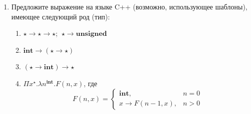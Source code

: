 \documentclass[10pt,a4paper,oneside]{article}
\begin{document}
\begin{enumerate}
\begin{verbatim}
One ("a", Zero (One ((("b","c"),("d","e")), Nil)))
\end{verbatim}

По идее, операция добавления элемента к списку записывается на языке Окамль вот так 
(сравните с прибавлением 1 к числу в двоичной системе счисления):

\begin{verbatim}
let rec add elem lst = match lst with
    Nil -> One (elem,Nil)
  | Zero tl -> One (elem,tl)
  | One (hd,tl) -> Zero (add (elem,hd) tl)
\end{verbatim}

Однако, тип этой функции Окамль вывести автоматически не может, его надо указывать явно,
чтобы код скомпилировался:

\begin{verbatim}
let rec add : 'a . 'a -> 'a bin_list -> 'a bin_list = fun elem lst -> match lst with
\end{verbatim}
\begin{enumerate}
\item Какой тип имеет \verb!add! в (расширенной) системе $F$ (напомним, поскольку функция рекурсивна,
она должна использовать Y-комбинатор в своём определении)?
Считайте, что семейство типов \verb!bin_list 'a! предопределено и обозначается как $\tau_\alpha$.
Также считайте, что определены функции roll и unroll с надлежащими типами.
Какой ранг имеет тип этой функции? Почему этот тип не выразим в типовой системе Хиндли-Милнера?
\item Предложите функции для печати списка и для удаления элемента списка (головы).
\item Предложите функцию для эффективного соединения двух списков (источник для 
вдохновения --- сложение двух чисел в столбик).
\item Предложите функцию для эффективного выделения $n$-го элемента из списка.
\end{enumerate}


\item Предложите выражение на языке C++ (возможно, использующее шаблоны), имеющее следующий род (тип):
\begin{enumerate}
\item $\star\rightarrow\star\rightarrow\star$; $\ \star\rightarrow\textbf{unsigned}$
\item $\textbf{int}\rightarrow(\star\rightarrow\star)$
\item $(\star\rightarrow\textbf{int})\rightarrow\star$
\item $\Pi x^\star.\lambda n^\textbf{int}.F(n,x)$, где $$F(n,x) = \left\{\begin{array}{ll}\textbf{int}, & n = 0\\
                                   x\rightarrow F(n-1,x), & n > 0\end{array}\right.$$
\end{enumerate}

\end{enumerate}
\end{document}
